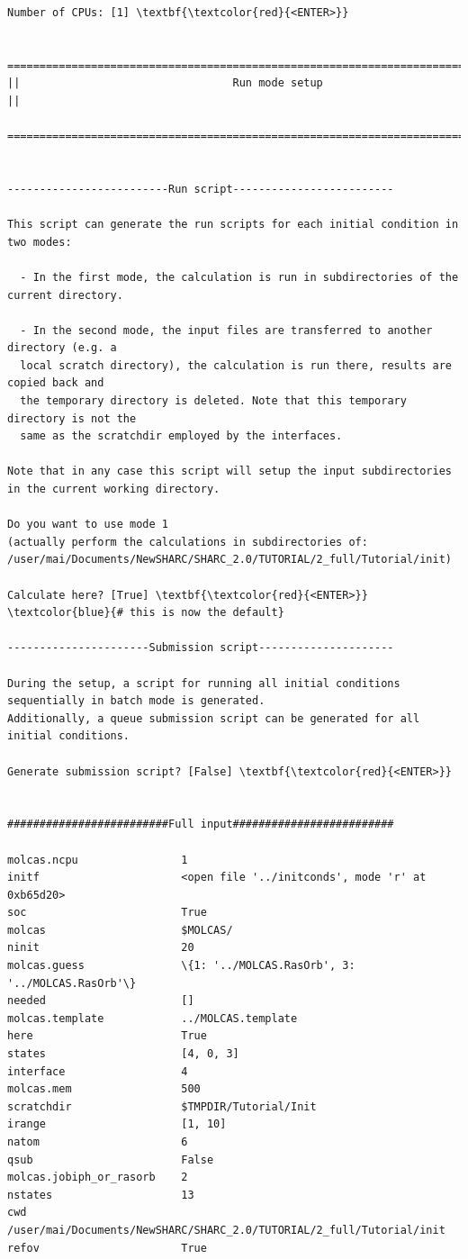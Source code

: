 \documentclass[a4paper,11pt,DIV=15,openany]{scrbook}
\begin{document}
\begin{oframed}
\begin{Verbatim}[commandchars=\\\{\}]
Number of CPUs: [1] \textbf{\textcolor{red}{<ENTER>}}

  ================================================================================
||                                 Run mode setup                                 ||
  ================================================================================


-------------------------Run script-------------------------

This script can generate the run scripts for each initial condition in two modes:

  - In the first mode, the calculation is run in subdirectories of the current directory.

  - In the second mode, the input files are transferred to another directory (e.g. a 
  local scratch directory), the calculation is run there, results are copied back and 
  the temporary directory is deleted. Note that this temporary directory is not the 
  same as the scratchdir employed by the interfaces.

Note that in any case this script will setup the input subdirectories in the current working directory. 

Do you want to use mode 1 
(actually perform the calculations in subdirectories of: 
/user/mai/Documents/NewSHARC/SHARC_2.0/TUTORIAL/2_full/Tutorial/init)

Calculate here? [True] \textbf{\textcolor{red}{<ENTER>}}     \textcolor{blue}{# this is now the default}

----------------------Submission script---------------------

During the setup, a script for running all initial conditions sequentially in batch mode is generated. 
Additionally, a queue submission script can be generated for all initial conditions.

Generate submission script? [False] \textbf{\textcolor{red}{<ENTER>}}


#########################Full input#########################

molcas.ncpu                1
initf                      <open file '../initconds', mode 'r' at 0xb65d20>
soc                        True
molcas                     $MOLCAS/
ninit                      20
molcas.guess               \{1: '../MOLCAS.RasOrb', 3: '../MOLCAS.RasOrb'\}
needed                     []
molcas.template            ../MOLCAS.template
here                       True
states                     [4, 0, 3]
interface                  4
molcas.mem                 500
scratchdir                 $TMPDIR/Tutorial/Init
irange                     [1, 10]
natom                      6
qsub                       False
molcas.jobiph_or_rasorb    2
nstates                    13
cwd                        /user/mai/Documents/NewSHARC/SHARC_2.0/TUTORIAL/2_full/Tutorial/init
refov                      True


\end{Verbatim}
\end{oframed}
\end{document}
